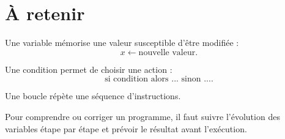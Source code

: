 \section{À retenir}

\begin{aretenir}
Une variable mémorise une valeur susceptible d'être modifiée :
\[
\boxed{x\leftarrow\text{nouvelle valeur}}.
\]

Une condition permet de choisir une action :
\[
\boxed{\text{si condition alors ... sinon ...}}.
\]

Une boucle répète une séquence d'instructions.

Pour comprendre ou corriger un programme, il faut suivre l'évolution des variables étape par étape et prévoir le résultat avant l'exécution.
\end{aretenir}
